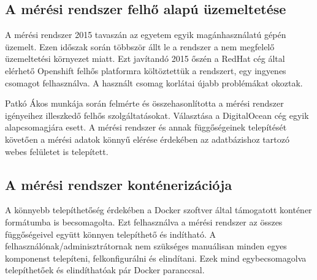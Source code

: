 \subsection*{A mérési rendszer felhő alapú üzemeltetése}
A mérési rendszer 2015 tavaszán az egyetem egyik magánhasználatú gépén üzemelt. Ezen időszak során többször állt le a rendszer a nem megfelelő üzemeltetési környezet miatt. Ezt javítandó 2015 őszén a RedHat cég által elérhető Openshift felhős platformra költöztettük a rendszert, egy ingyenes csomagot felhasználva. A használt csomag korlátai újabb problémákat okoztak.

Patkó Ákos munkája során felmérte és összehasonlította a mérési rendszer igényeihez illeszkedő felhős szolgáltatásokat. Választása a DigitalOcean cég egyik alapcsomagjára esett.
A mérési rendszer és annak függőségeinek telepítését követően a mérési adatok könnyű elérése érdekében az adatbázishoz tartozó webes felületet is telepített.

\subsection*{A mérési rendszer konténerizációja}
A könnyebb telepíthetőség érdekében a Docker szoftver által támogatott konténer formátumba is becsomagolta. Ezt felhasználva a mérési rendszer az összes függőségeivel együtt könnyen telepíthető és indítható.
A felhasználónak/adminisztrátornak nem szükséges manuálisan minden egyes komponenst telepíteni, felkonfigurálni és elindítani. Ezek mind egybecsomagolva telepíthetőek és elindíthatóak pár Docker paranccsal.














